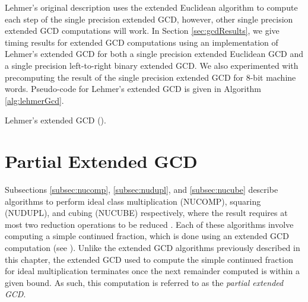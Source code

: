 \documentclass{ucalgthes1}
\theoremstyle{definition}
\newcommand{\algnewline}{\par\noindent\hskip\algorithmicindent}
\newcommand{\ZZ}{\mathbb{Z}}
\newcommand{\matrixtt}[4]{\left[ \begin{array}{rr} #1 & #2 \\ #3 & #4 \end{array} \right]}
\newcommand{\matrixThreeTwo}[6]{\left[ \begin{array}{rrr} #1 & #2 & #3 \\ #4 & #5 & #6 \end{array} \right]}
\newcommand{\floor}[1]{\left\lfloor #1 \right\rfloor}
\begin{document}
Lehmer's original description \cite{Lehmer1938} uses the extended Euclidean algorithm to compute each step of the single precision extended GCD, however, other single precision extended GCD computations will work.  In Section \ref{sec:gcdResults}, we give timing results for extended GCD computations using an implementation of Lehmer's extended GCD for both a single precision extended Euclidean GCD and a single precision left-to-right binary extended GCD.  We also experimented with precomputing the result of the single precision extended GCD for 8-bit machine words.  Pseudo-code for Lehmer's extended GCD is given in Algorithm \ref{alg:lehmerGcd}.

\begin{algorithm}[htb]
\caption{Lehmer's extended GCD (\cite{Lehmer1938}).}
\label{alg:lehmerGcd}
\end{algorithm}


\section{Partial Extended GCD}
\label{sec:gcdPartial}

Subsections \ref{subsec:nucomp}, \ref{subsec:nudupl}, and \ref{subsec:nucube} describe algorithms to perform ideal class multiplication (NUCOMP), squaring (NUDUPL), and cubing (NUCUBE) respectively, where the result requires at most two reduction operations to be reduced \cite[p.122]{Jacobson2009}.  Each of these algorithms involve computing a simple continued fraction, which is done using an extended GCD computation (see \cite[\S 3.2]{Jacobson2009}).  Unlike the extended GCD algorithms previously described in this chapter, the extended GCD used to compute the simple continued fraction for ideal multiplication terminates once the next remainder computed is within a given bound.  As such, this computation is referred to as the \emph{partial extended GCD}.
\end{document}
